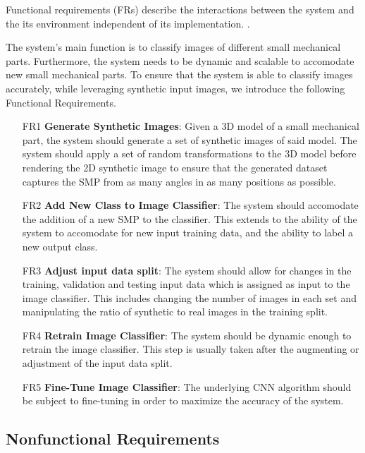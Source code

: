 \documentclass[a4paper,12pt,twoside]{report}
\begin{document}
Functional requirements (FRs) describe the interactions between the system and the its environment independent of its implementation. \cite{bruegge2004object}.

The system's main function is to classify images of different small mechanical parts. Furthermore, the system needs to be dynamic and scalable to accomodate new small mechanical parts. To ensure that the system is able to classify images accurately, while leveraging synthetic input images, we introduce the following Functional Requirements.

\begin{itemize}
  \item [FR1] \textbf{Generate Synthetic Images}: Given a 3D model of a small mechanical part, the system should generate a set of synthetic images of said model. The system should apply a set of random transformations to the 3D model before rendering the 2D synthetic image to ensure that the generated dataset captures the SMP from as many angles in as many positions as possible.

  \item [FR2] \textbf{Add New Class to Image Classifier}: The system should accomodate the addition of a new SMP to the classifier. This extends to the ability of the system to accomodate for new input training data, and the ability to label a new output class.

  \item [FR3] \textbf{Adjust input data split}: The system should allow for changes in the training, validation and testing input data which is assigned as input to the image classifier. This includes changing the number of images in each set and manipulating the ratio of synthetic to real images in the training split.

  \item [FR4] \textbf{Retrain Image Classifier}: The system should be dynamic enough to retrain the image classifier. This step is usually taken after the augmenting or adjustment of the input data split.

  \item [FR5] \textbf{Fine-Tune Image Classifier}: The underlying CNN algorithm should be subject to fine-tuning in order to maximize the accuracy of the system.
\end{itemize}

\subsection{Nonfunctional Requirements}
\end{document}
